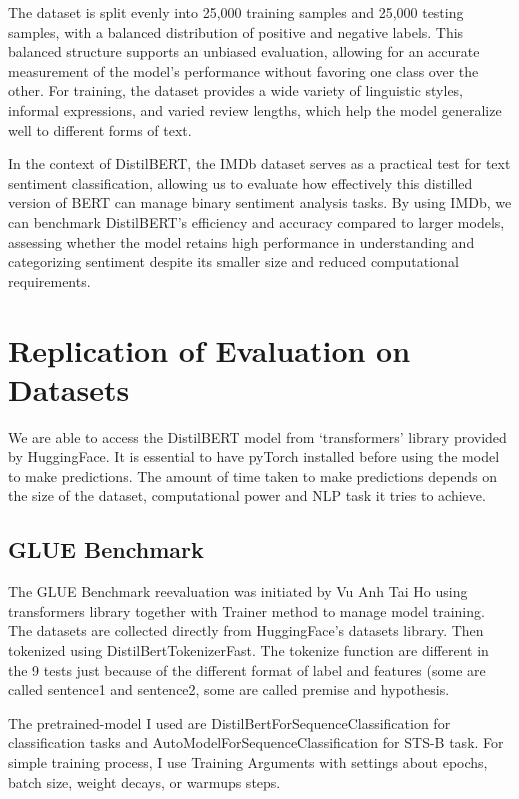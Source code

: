 \documentclass[
  11pt,
]{article}
\begin{document}
The dataset is split evenly into 25,000 training samples and 25,000 testing samples, with a balanced distribution of positive and negative labels. This balanced structure supports an unbiased evaluation, allowing for an accurate measurement of the model's performance without favoring one class over the other. For training, the dataset provides a wide variety of linguistic styles, informal expressions, and varied review lengths, which help the model generalize well to different forms of text.

In the context of DistilBERT, the IMDb dataset serves as a practical test for text sentiment classification, allowing us to evaluate how effectively this distilled version of BERT can manage binary sentiment analysis tasks. By using IMDb, we can benchmark DistilBERT’s efficiency and accuracy compared to larger models, assessing whether the model retains high performance in understanding and categorizing sentiment despite its smaller size and reduced computational requirements.


\section{Replication of Evaluation on
Datasets}\label{replication-of-evaluation-on-datasets}

We are able to access the DistilBERT model from `transformers' library
provided by HuggingFace. It is essential to have pyTorch installed
before using the model to make predictions. The amount of time taken to
make predictions depends on the size of the dataset, computational power
and NLP task it tries to achieve.

\subsection{GLUE Benchmark}\label{glue-benchmark-1}

The GLUE Benchmark reevaluation was initiated by Vu Anh Tai Ho using
transformers library together with Trainer method to manage model
training. The datasets are collected directly from HuggingFace's
datasets library. Then tokenized using DistilBertTokenizerFast. The
tokenize function are different in the 9 tests just because of the
different format of label and features (some are called sentence1 and
sentence2, some are called premise and hypothesis.

The pretrained-model I used are DistilBertForSequenceClassification for
classification tasks and AutoModelForSequenceClassification for STS-B
task. For simple training process, I use Training Arguments with
settings about epochs, batch size, weight decays, or warmups steps.
\end{document}
